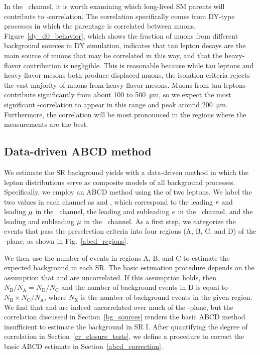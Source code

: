 In the \Pgm\Pgm\ channel, it is worth examining which long-lived SM parents will contribute to \ad-\ad correlation. The correlation specifically comes from DY-type processes in which the parentage is correlated between muons. Figure~\ref{dy_d0_behavior}, which shows the fraction of muons from different background sources in DY simulation, indicates that tau lepton decays are the main source of muons that may be correlated in this way, and that the heavy-flavor contribution is negligible. This is reasonable because while tau leptons and heavy-flavor mesons both produce displaced muons, the isolation criteria rejects the vast majority of muons from heavy-flavor mesons.  Muons from tau leptons contribute significantly from about \num{100} to \SI{500}{\um}, so we expect the most significant \ad-\ad correlation to appear in this range and peak around \SI{200}{\um}. Furthermore, the correlation will be most pronounced in the regions where the \ad measurements are the best.



\subsection{Data-driven ABCD method}
\label{abcd}
We estimate the SR background yields with a data-driven method in which the lepton \ad distributions serve as composite models of all background processes. Specifically, we employ an ABCD method using the \ad of two leptons. We label the two \ad values in each channel as \ada and \adb, which correspond to the leading $e$ and leading ${\mu}$ in the \Pe\Pgm\ channel, the leading and subleading $e$ in the \Pe\Pe\ channel, and the leading and subleading ${\mu}$ in the \Pgm\Pgm\ channel. As a first step, we categorize the events that pass the preselection criteria into four regions (A, B, C, and D) of the \ada-\adb plane, as shown in Fig.~\ref{abcd_regions}.



We then use the number of events in regions A, B, and C to estimate the expected background in each SR. The basic estimation procedure depends on the assumption that \ada and \adb are uncorrelated. If this assumption holds, then $N_{\text{B}}/N_{\text{A}}=N_{\text{D}}/N_{\text{C}}$ and the number of background events in D is equal to $N_{\text{B}}\times N_{\text{C}}/N_{\text{A}}$, where $N_{\text{X}}$ is the number of background events in the given region. We find that \ada and \adb are indeed uncorrelated over much of the \ad-\ad plane, but the correlation discussed in Section~\ref{bg_sources} renders the basic ABCD method insufficient to estimate the background in SR I. After quantifying the degree of correlation in Section~\ref{cr_closure_tests}, we define a procedure to correct the basic ABCD estimate in Section~\ref{abcd_correction}.

